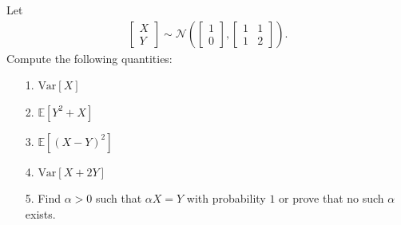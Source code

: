 \documentclass[a4paper]{article}
\begin{document}
\begin{Exercise}
	Let 
	\begin{align*}
		\begin{bmatrix}
			X \\ Y
			\end{bmatrix} \sim \mathcal{N} \left( \begin{bmatrix}
				1 \\ 0
			\end{bmatrix},
				\begin{bmatrix}
				1 & 1 \\ 1 & 2
			\end{bmatrix}
		\right).
	\end{align*}
	Compute the following quantities:
	\begin{itemize}
		\item[1.] $\text{Var}[X]$
		\item[2.] $\mathbb{E}[Y^2 + X]$
		\item[3.] $\mathbb{E}[(X - Y)^2]$
		\item[4.] $\text{Var}[X + 2Y]$
		\item[5.] Find $\alpha > 0$ such that $\alpha X = Y$ with probability $1$ or prove that no such $\alpha$ exists.
	\end{itemize}
\end{Exercise}
\end{document}

